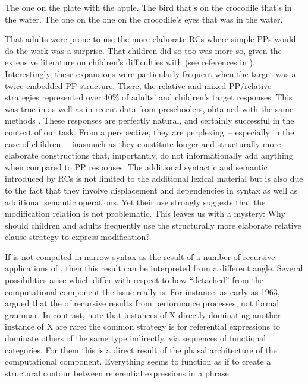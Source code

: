 \documentclass[output=paper]{langsci/langscibook}
\begin{document}
\ea\label{ex:bejar:4}
    \ea\label{ex:bejar:4a} The one on the plate with the apple.
    \ex\label{ex:bejar:4b} The bird that’s on the crocodile that’s in the water.
    \ex\label{ex:bejar:4c} The one on the one on the crocodile’s eyes that was in the   water.
    \z
\z

That adults were prone to use the more elaborate \glspl{RC} where simple PPs
would do the work was a surprise. That children did so too was more so, given
the extensive literature on children’s difficulties with 
(see references in \citealt{FriedmannEtAl2009,Givon2009}). Interestingly, these
expansions were particularly frequent when the target was a twice-embedded PP
structure.  There, the relative and mixed PP/relative strategies represented over
40\% of adults’ and children’s target responses. This was true in  as
well as in recent data from  preschoolers, obtained with the same methods
\citep{Lowles2016}. These responses are perfectly natural, and certainly
successful in the context of our task. From a  perspective,
they are perplexing~-- especially in the case of children~-- inasmuch as they
constitute longer and structurally more elaborate constructions that,
importantly, do not informationally add anything when compared to PP responses.
The additional syntactic and semantic  introduced by \glspl{RC}
is not limited to the additional lexical material but is also due to the fact
that they involve displacement and dependencies in syntax as well as additional
semantic operations. Yet their use strongly suggests that the modification
relation is not problematic. This leaves us with a mystery: Why should children
and adults frequently use the structurally more elaborate relative clause
strategy to express modification?

If  is not computed in narrow syntax as the result of a number of
recursive applications of , then this result can be interpreted from
a different angle. Several possibilities arise which differ with respect to
how \enquote{detached} from the computational component the  issue
really is. For instance, as early as 1963, \citeauthor{ChoMil1963} argued that
the  of recursive  results
from performance processes, not formal grammar.  In contrast, \citet{ArsHin2012}
note that instances of X directly dominating another instance of X are rare:
the common strategy is for referential expressions to dominate others of the
same type indirectly, via sequences of functional categories. For them this is
a direct result of the phasal architecture of the computational component.
Everything seems to function as if to create a structural contour between
referential expressions in a phrase.
\end{document}
